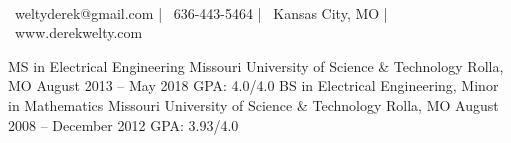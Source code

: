 \documentclass[]{awesome-cv}
\begin{document}
    
\begin{center}
	  \\
	\vspace{2mm}
	{\faEnvelope\ weltyderek@gmail.com} | {\faMobile\ 636-443-5464} | {\faMapMarker\ Kansas City, MO} | {\faLink\ www.derekwelty.com}
\end{center}
\begin{cventries}
	\cventry
	{MS in Electrical Engineering}
	{Missouri University of Science \& Technology}
	{Rolla, MO}
	{August 2013 – May 2018}
	{GPA: 4.0/4.0}
	\cventry
	{BS in Electrical Engineering, Minor in Mathematics}
	{Missouri University of Science \& Technology}
	{Rolla, MO}
	{August 2008 – December 2012}
	{GPA: 3.93/4.0}
\end{cventries}
\end{document}
